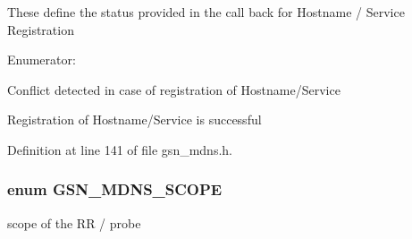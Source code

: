 These define the status provided in the call back for Hostname / Service Registration \begin{Desc}
\item[Enumerator: ]\par
\begin{description}
\item[{\em 
\hypertarget{a00668_gga4736a957266d4e3ba37c9d5ec86beec8ae3550fd7b1f603639481cabb668a64a7}{
GSN\_\-MDNS\_\-REG\_\-CONFLICT}
\label{a00668_gga4736a957266d4e3ba37c9d5ec86beec8ae3550fd7b1f603639481cabb668a64a7}
}]Conflict detected in case of registration of Hostname/Service \item[{\em 
\hypertarget{a00668_gga4736a957266d4e3ba37c9d5ec86beec8a522d97bab05dc2d11054ab2e8403639b}{
GSN\_\-MDNS\_\-REG\_\-SUCCESS}
\label{a00668_gga4736a957266d4e3ba37c9d5ec86beec8a522d97bab05dc2d11054ab2e8403639b}
}]Registration of Hostname/Service is successful \end{description}
\end{Desc}



Definition at line 141 of file gsn\_\-mdns.h.

\hypertarget{a00668_gabcc090f962c26d23957861a30b6bf166}{
\subsubsection[{GSN\_\-MDNS\_\-SCOPE}]{\setlength{\rightskip}{0pt plus 5cm}enum {\bf GSN\_\-MDNS\_\-SCOPE}}}
\label{a00668_gabcc090f962c26d23957861a30b6bf166}


scope of the RR / probe 

